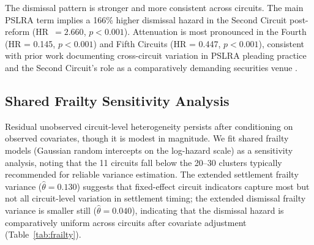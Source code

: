 The dismissal pattern is stronger and more consistent across circuits. The
main PSLRA term implies a 166\% higher dismissal hazard in the Second
Circuit post-reform (HR~$= 2.660$, $p < 0.001$). Attenuation is most pronounced in the Fourth (HR = 0.145, $p < 0.001$) and Fifth Circuits (HR = 0.447, $p < 0.001$), consistent with prior work documenting cross-circuit variation in PSLRA pleading practice and the Second Circuit's role as a comparatively demanding securities venue \citep{perino2003, choi2007}.

\subsection{Shared Frailty Sensitivity Analysis}
\label{sec:frailty}

Residual unobserved circuit-level heterogeneity persists
after conditioning on observed covariates, though it is
modest in magnitude. We fit shared frailty models
(Gaussian random intercepts on the log-hazard scale) as a sensitivity analysis, noting that the
11 circuits fall below the 20--30 clusters typically
recommended for reliable variance estimation. The extended
settlement frailty variance ($\hat{\theta} = 0.130$)
suggests that fixed-effect circuit indicators capture most
but not all circuit-level variation in settlement timing; the
extended dismissal frailty variance is smaller still
($\hat{\theta} = 0.040$), indicating that the dismissal
hazard is comparatively uniform across circuits after
covariate adjustment (Table~\ref{tab:frailty}).

